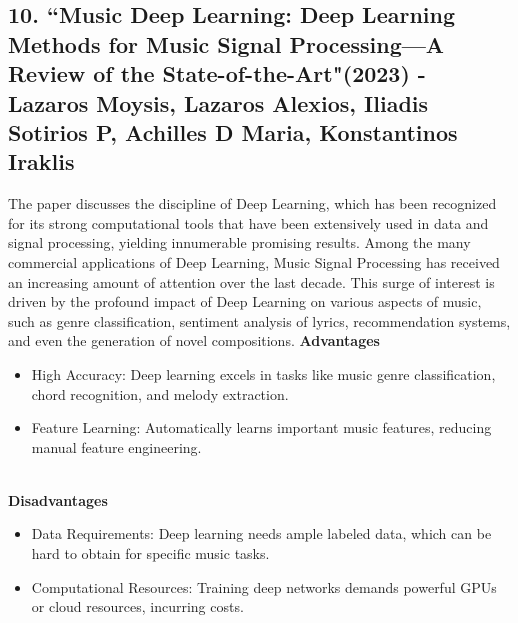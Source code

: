 \documentclass[11pt]{report}
\begin{document}
\subsection*{10.  ``Music Deep Learning: Deep Learning Methods for Music Signal Processing—A Review of the State-of-the-Art"(2023) - Lazaros Moysis, Lazaros Alexios, Iliadis Sotirios P, Achilles D Maria, Konstantinos Iraklis \cite{reference10}}
The paper discusses the discipline of Deep Learning, which has been recognized for its strong computational tools that have been extensively used in data and signal processing, yielding innumerable promising results. Among the many commercial applications of Deep Learning, Music Signal Processing has received an increasing amount of attention over the last decade. This surge of interest is driven by the profound impact of Deep Learning on various aspects of music, such as genre classification, sentiment analysis of lyrics, recommendation systems, and even the generation of novel compositions.
\clearpage
\textbf{Advantages}
    \begin{itemize}
        \item High Accuracy: Deep learning excels in tasks like music genre classification, chord recognition, and melody extraction.
        \item Feature Learning: Automatically learns important music features, reducing manual feature engineering.
    \end{itemize}
\\    
    \textbf{Disadvantages}
    \begin{itemize}
        \item Data Requirements: Deep learning needs ample labeled data, which can be hard to obtain for specific music tasks.
        \item Computational Resources: Training deep networks demands powerful GPUs or cloud resources, incurring costs.
    \end{itemize}\\\\
\clearpage
\end{document}
